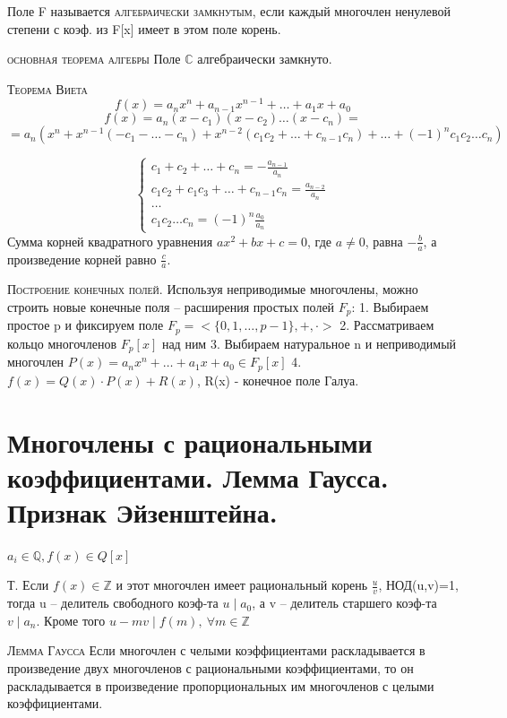 \documentclass{article}
\begin{document}
Поле F называется \textsc{алгебраически замкнутым}, если каждый многочлен ненулевой степени с коэф. из F[x] имеет в этом поле корень.

\textsc{основная теорема алгебры}
Поле $\mathbb{C}$ алгебраически замкнуто.

\textsc{Теорема Виета}
$$f(x)=a_nx^n+a_{n-1}x^{n-1}+\dots+a_1x+a_0$$
$$f(x)=a_n(x-c_1)(x-c_2)\dots(x-c_n)=$$
$$=a_n(x^n+x^{n-1}(-c_1-\dots-c_n)+x^{n-2}(c_1c_2+\dots+c_{n-1}c_n)+\dots+(-1)^nc_1c_2\dots c_n)$$

\begin{equation*}
    \begin{cases}
        c_1+c_2+\dots+c_n=-\frac{a_{n-1}}{a_n} \\
        c_1c_2+c_1c_3+\dots+c_{n-1}c_n=\frac{a_{n-2}}{a_n} \\
        \dots \\
        c_1c_2\dots c_n=(-1)^n\frac{a_0}{a_n}
    \end{cases}
\end{equation*}
Сумма корней квадратного уравнения $ax^2+bx+c=0$, где $a \neq 0$, равна $-\frac{{b}}{{a}}$, а произведение корней равно $\frac{{c}}{{a}}$.

\textsc{Построение конечных полей.}
Используя неприводимые многочлены, можно строить новые конечные поля – расширения простых полей $F_p$:
1. Выбираем простое p и фиксируем поле $F_p=<\{0,1,\dots,p-1\},+,\cdot>$ 2. Рассматриваем кольцо многочленов $F_p[x]$ над ним
3. Выбираем натуральное n и неприводимый многочлен $P(x)=a_nx^n+\dots+a_1x+a_0\in F_p[x]$ 4. $f(x)=Q(x)\cdot P(x)+R(x)$, R(x) - конечное поле Галуа.

\section{Многочлены с рациональными коэффициентами. Лемма Гаусса. Признак Эйзенштейна.}

$a_i\in \mathbb{Q}, f(x)\in Q[x]$

Т. Если $f(x)\in \mathbb{Z}$ и этот многочлен имеет рациональный корень $\frac{u}{v}$, НОД(u,v)=1, тогда u – делитель
свободного коэф-та $u\mid a_0$, а v – делитель старшего коэф-та $v\mid a_n$. Кроме того $u-mv\mid f(m),\ \forall m\in \mathbb{Z}$

\textsc{Лемма Гаусса}
Если многочлен с челыми коэффициентами раскладывается в произведение двух многочленов с рациональными коэффициентами, то он раскладывается в произведение пропорциональных им многочленов с целыми коэффициентами.
\end{document}
